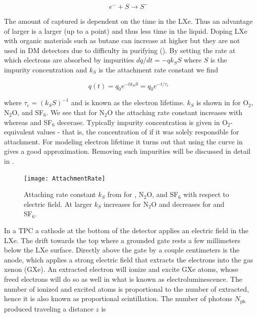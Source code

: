 \begin{equation}
e^{-} + S \rightarrow S^{-}
\label{eq:impurity_attach}
\end{equation}

\noindent The amount of \electron captured is dependent on the time in the LXe.  Thus an advantage of larger \efields is a larger
\vd (up to a point) and thus less time in the liquid.  Doping LXe with organic materials such as butane can increase \vd at higher
\efields but they are not used in DM detectors due to difficulty in purifying ().  By setting the rate at which
electrons are absorbed by impurities $dq/dt = -qk_{S}S$ where $S$ is the impurity concentration and $k_{S}$ is the attachment rate
constant we find

\begin{equation}
q(t) = q_{0}e^{-tk_{S}S} = q_{0}e^{-t/\tau_{e}}
\label{eq:lifetime_equation}
\end{equation}

\noindent where $\tau_{e} = (k_{S}S)^{-1}$ and is known as the electron lifetime.  $k_{S}$ is shown in  for
O$_{2}$,
N$_{2}$O, and SF$_{6}$.  We see that for N$_{2}$O the attaching rate constant increases with \efield whereas \otwo and SF$_{6}$
decerase.  Typically impurity concentration is given in O$_{2}$-equivalent values - that is, the concentration of \otwo if it was solely
responsible for \electron attachment.  For modeling electron lifetime it turns out that using the \otwo curve in
 gives a good approximation.  Removing such impurities will be discussed in detail in \secref{}.

\begin{figure}
\texttt{[image: AttachmentRate]}
\caption{Attaching rate constant $k_{S}$ from  for \otwo, N$_{2}$O, and SF$_{6}$ with respect to electric field.  At
larger \efield $k_{S}$ increases for N$_{2}$O and decreases for \otwo and SF$_{6}$.}
\label{fig:attachment_rate}
\end{figure}

In a TPC a cathode at the bottom of the detector applies an electric field in the LXe.  The \electron drift towards the top where a
grounded gate rests a few millimeters below the LXe surface.  Directly above the gate by a couple centimeters is the anode, which
applies a strong electric field that extracts the electrons into the gas xenon (GXe).  An extracted electron will ionize and excite
GXe atoms, whose freed electrons will do so as well in what is known as electroluminescence.  The number of ionized and excited atoms
is proportional to the number of \electron extracted, hence it is also known as proportional scintillation.  The number of photons
$N_{\mathrm{ph}}$ produced traveling a distance $z$ is

